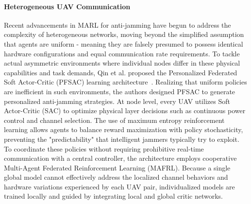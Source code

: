 \documentclass[journal]{IEEEtran}
\newcommand{\adm}[1]{{\color{orange}{[#1]}}}
\begin{document}
\paragraph{Heterogeneous UAV Communication} 
Recent advancements in MARL for anti-jamming have begun to address the complexity of heterogeneous networks, moving beyond the simplified assumption that agents are uniform - meaning they are falsely presumed to possess identical hardware configurations and equal communication rate requirements.
To tackle actual asymmetric environments where individual nodes differ in these physical capabilities and task demands, Qin et al. proposed the Personalized Federated Soft Actor-Critic (PFSAC) learning architecture~\cite{qin2025multi}.
Realizing that uniform policies are inefficient in such environments, the authors designed PFSAC to generate personalized anti-jamming strategies.
%
At node level, every UAV utilizes Soft Actor-Critic (SAC) to optimize physical layer decisions such as continuous power control and channel selection. 
The use of maximum entropy reinforcement learning allows agents to balance reward maximization with policy stochasticity, preventing the "predictability" that intelligent jammers typically try to exploit.
To coordinate these policies without requiring prohibitive real-time communication with a central controller, the architecture employs cooperative Multi-Agent Federated Reinforcement Learning (MAFRL). 
Because a single global model cannot effectively address the localized channel behaviors and hardware variations experienced by each UAV pair, individualized models are trained locally and guided by integrating local and global critic networks.
\end{document}
